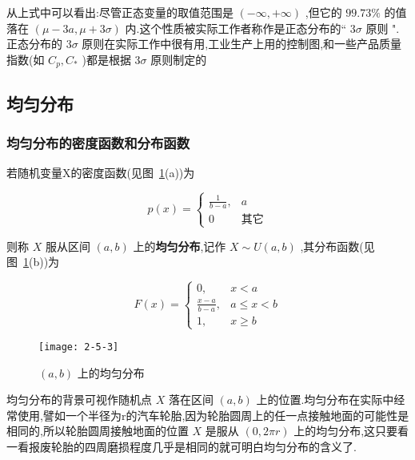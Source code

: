 从上式中可以看出:尽管正态变量的取值范围是 $ (-\infty,+\infty) $ ,但它的 $ 99.73\% $ 的值落在 $ (\mu-3 a, \mu+3 \sigma) $ 内.这个性质被实际工作者称作是正态分布的`` $ 3\sigma $ 原则 ".正态分布的 $ 3\sigma $ 原则在实际工作中很有用,工业生产上用的控制图,和一些产品质量指数(如 $ C_{p}, C_{*} $ )都是根据 $ 3\sigma $ 原则制定的


\subsection{均匀分布}\label{ssec:2.5.2}

\subsubsection{均匀分布的密度函数和分布函数}

若随机变量X的密度函数(见图~\ref{fig:2.5.3}(a))为

\begin{equation}
p(x)=\left\{
\begin{array}{ll}
{\frac{1}{b-a},} & {a}        \\ 
{0}              &{\text{其它}}
\end{array}
\right. \label{eq:2.5.6}
\end{equation}

则称 $ X $ 服从区间 $ (a,b) $ 上的\textbf{均匀分布},记作 $ X \sim U(a, b) $ ,其分布函数(见图~\ref{fig:2.5.3}(b))为

\begin{equation}
F(x)=\left\{
\begin{array}{ll}
{0,} & {x<a} \\ 
{\frac{x-a}{b-a},} & {a \leqslant x<b} \\ 
{1,} & {x \geqslant b}
\end{array}
\right. \label{eq:2.5.7}
\end{equation}

\begin{figure}
	\centering
	\texttt{[image: 2-5-3]}
	\caption{ $ (a,b) $ 上的均匀分布}
	\label{fig:2.5.3}
\end{figure}

均匀分布的背景可视作随机点 $ X $ 落在区间 $ (a,b) $ 上的位置.均匀分布在实际中经常使用,譬如一个半径为r的汽车轮胎,因为轮胎圆周上的任一点接触地面的可能性是相同的,所以轮胎圆周接触地面的位置 $ X $ 是服从 $ (0,2 \pi r) $ 上的均匀分布,这只要看一看报废轮胎的四周磨损程度几乎是相同的就可明白均匀分布的含义了.

